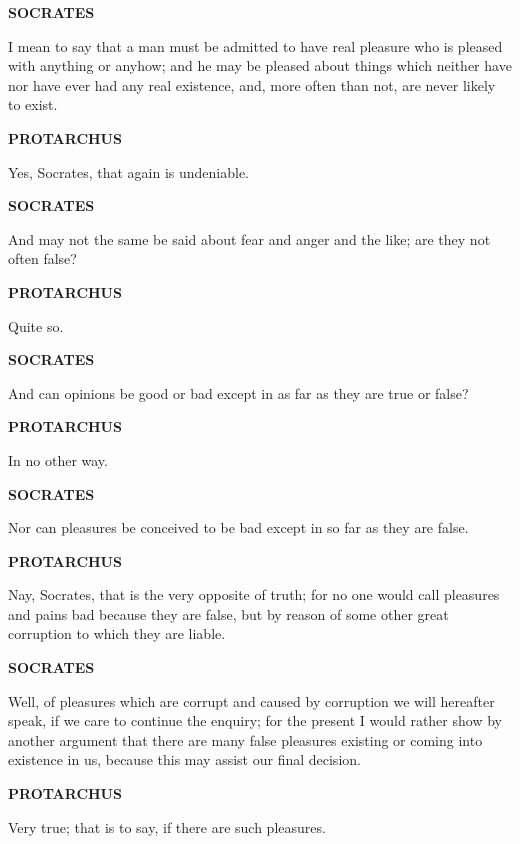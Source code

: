 \documentclass[11pt,letter]{article}
\begin{document}
\par \textbf{SOCRATES}
\par   I mean to say that a man must be admitted to have real pleasure who is pleased with anything or anyhow; and he may be pleased about things which neither have nor have ever had any real existence, and, more often than not, are never likely to exist.

\par \textbf{PROTARCHUS}
\par   Yes, Socrates, that again is undeniable.

\par \textbf{SOCRATES}
\par   And may not the same be said about fear and anger and the like; are they not often false?

\par \textbf{PROTARCHUS}
\par   Quite so.

\par \textbf{SOCRATES}
\par   And can opinions be good or bad except in as far as they are true or false?

\par \textbf{PROTARCHUS}
\par   In no other way.

\par \textbf{SOCRATES}
\par   Nor can pleasures be conceived to be bad except in so far as they are false.

\par \textbf{PROTARCHUS}
\par   Nay, Socrates, that is the very opposite of truth; for no one would call pleasures and pains bad because they are false, but by reason of some other great corruption to which they are liable.

\par \textbf{SOCRATES}
\par   Well, of pleasures which are corrupt and caused by corruption we will hereafter speak, if we care to continue the enquiry; for the present I would rather show by another argument that there are many false pleasures existing or coming into existence in us, because this may assist our final decision.

\par \textbf{PROTARCHUS}
\par   Very true; that is to say, if there are such pleasures.
\end{document}
